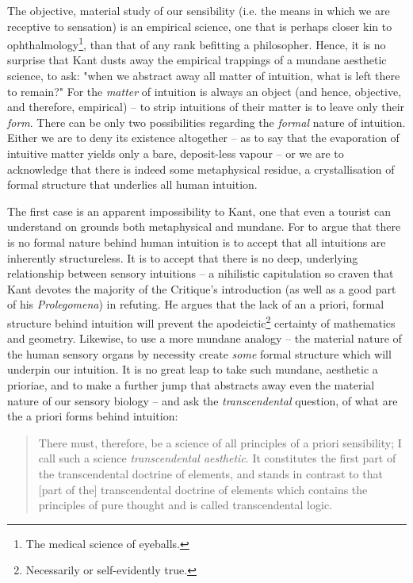 \noindent
The objective, material study of our sensibility (i.e. the means in which we are receptive to sensation) is an empirical science, one that is perhaps closer kin to ophthalmology\footnote{The medical science of eyeballs.}, than that of any rank befitting a philosopher. Hence, it is no surprise that Kant dusts away the empirical trappings of a mundane aesthetic science, to ask: "when we abstract away all matter of intuition, what is left there to remain?" For the \emph{matter} of intuition is always an object (and hence, objective, and therefore, empirical) -- to strip intuitions of their matter is to leave only their \emph{form}. There can be only two possibilities regarding the \emph{formal} nature of intuition. Either we are to deny its existence altogether -- as to say that the evaporation of intuitive matter yields only a bare, deposit-less vapour -- or we are to acknowledge that there is indeed some metaphysical residue, a crystallisation of formal structure that underlies all human intuition.

The first case is an apparent impossibility to Kant, one that even a tourist can understand on grounds both metaphysical and mundane. For to argue that there is no formal nature behind human intuition is to accept that all intuitions are inherently structureless. It is to accept that there is no deep, underlying relationship between sensory intuitions -- a nihilistic capitulation so craven that Kant devotes the majority of the Critique's introduction (as well as a good part of his \emph{Prolegomena}) in refuting. He argues that the lack of an a priori, formal structure behind intuition will prevent the apodeictic\footnote{Necessarily or self-evidently true.} certainty of mathematics and geometry. Likewise, to use a more mundane analogy -- the material nature of the human sensory organs by necessity create \emph{some} formal structure which will underpin our intuition. It is no great leap to take such mundane, aesthetic a prioriae, and to make a further jump that abstracts away even the material nature of our sensory biology -- and ask the \emph{transcendental} question, of what are the a priori forms behind intuition:

\begin{quote}
  There must, therefore, be a science of all principles of a priori sensibility; I call such a science \emph{transcendental aesthetic}. It constitutes the first part of the transcendental doctrine of elements, and stands in contrast to that [part of the] transcendental doctrine of elements which contains the principles of pure thought and is called transcendental logic.

  \autocite[B36]{hackett}
\end{quote}

